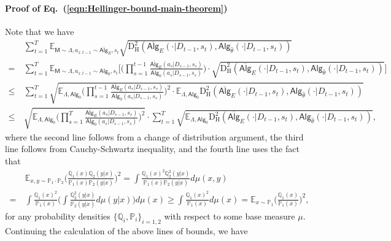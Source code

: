 \documentclass[10pt]{article}
\newcommand{\<}{\left\langle}
\renewcommand{\>}{\right\rangle}
\newcommand{\E}{\mathbb{E}}
\renewcommand{\P}{\mathbb{P}}
\newcommand{\Q}{\mathbb{Q}}
\newcommand{\inst}{{\mathsf{M}}}
\newcommand{\HelDs}{{\mathrm{D}^2_{\mathrm{H}}}}
\newcommand{\state}{{s}}
\newcommand{\action}{{a}}
\newcommand{\totlen}{{T}}
\newcommand{\sAlg}{{\mathsf{Alg}}}
\newcommand{\osAlg}{\overline{\mathsf{Alg}}}
\newcommand{\dset}{{D}}
\newcommand{\EstPar}{{\widehat{\theta}}}
\newcommand{\prior}{{\Lambda}}
\newcommand{\shortexp}{{E}}
\begin{document}
\paragraph{Proof of Eq.~(\ref{eqn:Hellinger-bound-main-theorem})} Note that we have
\begin{align*}
&~
\sum_{t=1}^\totlen\E_{\inst\sim\prior,\action_{1:t-1}\sim\osAlg_\shortexp,\state_t}\sqrt{\HelDs(\osAlg_{\shortexp}(\cdot|\dset_{t-1},\state_t),\sAlg_{\EstPar}(\cdot|\dset_{t-1},\state_t))}\\
=&~
\sum_{t=1}^\totlen\E_{\inst\sim\prior,\action_{1:t-1}\sim\sAlg_0,\state_t} \Big[
\Big(\prod_{s=1}^{t-1}\frac{\osAlg_\shortexp(\action_s|\dset_{s-1},\state_s)}{\sAlg_0(\action_s|\dset_{s-1},\state_s)}\Big)
\cdot
\sqrt{\HelDs(\osAlg_{\shortexp}(\cdot|\dset_{t-1},\state_t),\sAlg_{\EstPar}(\cdot|\dset_{t-1},\state_t))}\Big] \\
\leq&~
\sum_{t=1}^\totlen
\sqrt{\E_{\prior,\sAlg_0}
\Big(\prod_{s=1}^{t-1}\frac{\osAlg_\shortexp(\action_s|\dset_{s-1},\state_s)}{\sAlg_0(\action_s|\dset_{s-1},\state_s)}\Big)^2\cdot\E_{\prior,\sAlg_0}\HelDs(\osAlg_{\shortexp}(\cdot|\dset_{t-1},\state_t),\sAlg_{\EstPar}(\cdot|\dset_{t-1},\state_t))}\\
\leq &~
\sqrt{\E_{\prior,\sAlg_0}
\Big(\prod_{s=1}^{\totlen}\frac{\osAlg_\shortexp(\action_s|\dset_{s-1},\state_s)}{\sAlg_0(\action_s|\dset_{s-1},\state_s)}\Big)^2}
\cdot
\sum_{t=1}^\totlen\sqrt{\E_{\prior,\sAlg_0}\HelDs(\osAlg_{\shortexp}(\cdot|\dset_{t-1},\state_t),\sAlg_{\EstPar}(\cdot|\dset_{t-1},\state_t))},\end{align*}
where the second  line follows from a change of distribution argument, the third line follows from Cauchy-Schwartz inequality,  and the fourth line uses the fact that
\begin{align*}
&~\E_{x,y\sim\P_1\cdot\P_2}\Big(\frac{\Q_1(x)\Q_2(y|x)}{\P_1(x)\P_2(y|x)}\Big)^2
    =
    \int\frac{\Q_1(x)^2\Q_2^2(y|x)}{\P_1(x)\P_2(y|x)}d\mu(x,y)\\
    =&~
    \int\frac{\Q_1(x)^2}{\P_1(x)}\Big(\int\frac{\Q_2^2(y|x)}{\P_2(y|x)}d\mu(y|x)\Big)d\mu(x)
    \geq
    \int\frac{\Q_1(x)^2}{\P_1(x)}d\mu(x)= \E_{x\sim\P_1}\Big(\frac{\Q_1(x)}{\P_1(x)}\Big)^2,
\end{align*}
for any probability densities $\{ \Q_i,\P_i \}_{i=1,2}$ with respect to some base measure $\mu$.
Continuing the calculation of the above lines of bounds, we have
\end{document}
